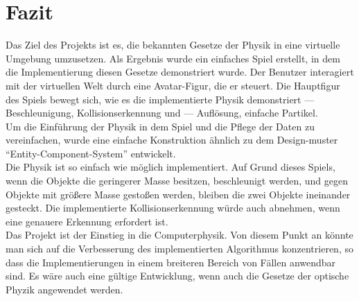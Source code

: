 \documentclass[
  10pt,
  a4paper,
  oneside,
  headers,
  headinclude,
  footinclude,
  BCOR5mm,
]{article}
\begin{document}
\section{Fazit}
Das Ziel des Projekts ist es, die bekannten Gesetze der Physik in eine virtuelle
Umgebung umzusetzen. Als Ergebnis wurde ein einfaches Spiel erstellt, in dem die
Implementierung diesen Gesetze demonstriert wurde. Der Benutzer interagiert mit
der virtuellen Welt durch eine Avatar-Figur, die er steuert. Die Hauptfigur des
Spiels bewegt sich, wie es die implementierte Physik demonstriert ---
Beschleunigung, Kollisionserkennung und --- Auflösung, einfache Partikel. \\
Um die Einführung der Physik in dem Spiel und die Pflege der Daten zu
vereinfachen, wurde eine einfache Konstruktion ähnlich zu dem Design-muster
``Entity-Component-System'' entwickelt. \\
Die Physik ist so einfach wie möglich implementiert. Auf Grund dieses Spiels,
wenn die Objekte  die geringerer Masse besitzen, beschleunigt werden, und gegen
Objekte mit größere Masse gestoßen werden, bleiben die zwei Objekte ineinander
gesteckt. Die implementierte Kollisionserkennung würde auch abnehmen, wenn eine
genauere Erkennung erfordert ist. \\
Das Projekt ist der Einstieg in die Computerphysik. Von diesem Punkt an könnte
man sich auf die Verbesserung des implementierten Algorithmus konzentrieren, so
dass die Implementierungen in einem breiteren Bereich von Fällen anwendbar sind.
Es wäre auch eine gültige Entwicklung, wenn auch die Gesetze der optische Phyzik
angewendet werden.
\end{document}

